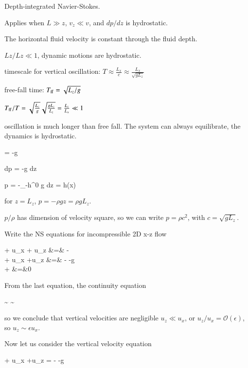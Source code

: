 Depth-integrated Navier-Stokes. 

Applies when $L\gg z$, $v_z \ll v$, and $dp/dz$ is hydrostatic.

The horizontal fluid velocity is constant through the fluid depth.

$Lz/Lz \ll 1$, dynamic motions are hydrostatic. 


timescale for vertical oscillation: $T \approx \frac{L_x}{c} \approx
\frac{L_x}{\sqrt{gL_z}}$

free-fall time: $T_{\rm ff}=\sqrt{L_z/g}$


$T_{\rm ff}/T = \sqrt{\frac{L_z}{g}} \sqrt{\frac{gL_z}{L_z}} =
\frac{L_z}{L_x} \ll 1 $


oscillation is much longer than free fall. The system can always
equilibrate, the dynamics is hydrostatic. 

\beq
{} = -\rho g 
\eeq

\beq
dp = -\rho g dz
\eeq


\beq
p = -\int_{-h}^0 \rho g dz = h(x)
\eeq


for $z = L_z$, $p=-\rho g z = \rho g L_z$. 

$p/\rho$ has dimension of velocity square, so we can write $p=\rho c^2$,
with $c=\sqrt{gL_z}$.

Write the NS equations for incompressible 2D x-z flow 

\beqn
{} + u_x + u_z &=& -\\
 + u_x +u_z &=& - -g \\
 +  &=&0
\eeqn

From the last equation, the continuity equation

\beq
{} \sim {} \longrightarrow {}
\sim {}  
\eeq

so we conclude that vertical velocities are negligible $u_z \ll u_x$,
or $u_z / u_x = \mathcal{O}(\epsilon)$, so $u_z \sim \epsilon u_x$.

Now let us consider the vertical velocity equation

\beq
{} + u_x +u_z = - -g 
\eeq

